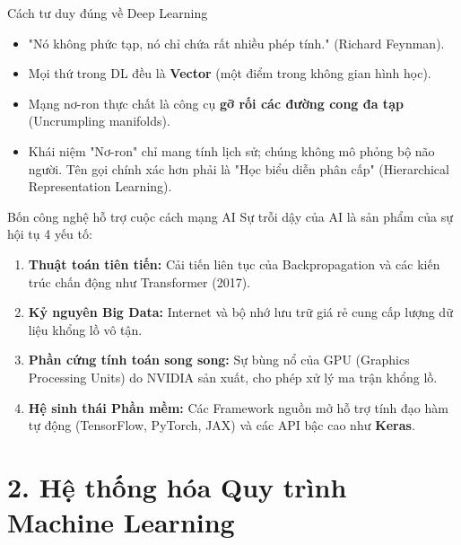 \documentclass[aspectratio=169]{beamer}
\begin{document}
\begin{frame}{Cách tư duy đúng về Deep Learning}
    \begin{itemize}
        \item "Nó không phức tạp, nó chỉ chứa rất nhiều phép tính." (Richard Feynman).
        \item Mọi thứ trong DL đều là \textbf{Vector} (một điểm trong không gian hình học).
        \item Mạng nơ-ron thực chất là công cụ \textbf{gỡ rối các đường cong đa tạp} (Uncrumpling manifolds).
        \item Khái niệm "Nơ-ron" chỉ mang tính lịch sử; chúng không mô phỏng bộ não người. Tên gọi chính xác hơn phải là "Học biểu diễn phân cấp" (Hierarchical Representation Learning).
    \end{itemize}
\end{frame}

\begin{frame}{Bốn công nghệ hỗ trợ cuộc cách mạng AI}
    Sự trỗi dậy của AI là sản phẩm của sự hội tụ 4 yếu tố:
    \begin{enumerate}
        \item \textbf{Thuật toán tiên tiến:} Cải tiến liên tục của Backpropagation và các kiến trúc chấn động như Transformer (2017).
        \item \textbf{Kỷ nguyên Big Data:} Internet và bộ nhớ lưu trữ giá rẻ cung cấp lượng dữ liệu khổng lồ vô tận.
        \item \textbf{Phần cứng tính toán song song:} Sự bùng nổ của GPU (Graphics Processing Units) do NVIDIA sản xuất, cho phép xử lý ma trận khổng lồ.
        \item \textbf{Hệ sinh thái Phần mềm:} Các Framework nguồn mở hỗ trợ tính đạo hàm tự động (TensorFlow, PyTorch, JAX) và các API bậc cao như \textbf{Keras}.
    \end{enumerate}
\end{frame}

\section{2. Hệ thống hóa Quy trình Machine Learning}
\end{document}
